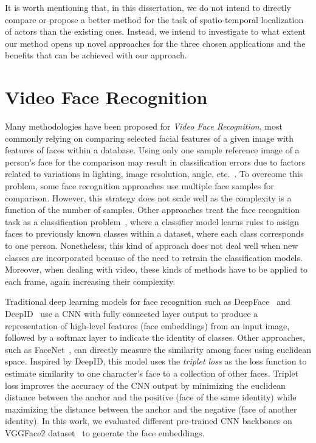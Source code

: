 It is worth mentioning that, in this dissertation, we do not intend to directly compare or propose a better method for the task of spatio-temporal localization of actors than the existing ones. Instead, we intend to investigate to what extent our method opens up novel approaches for the three chosen applications and the benefits that can be achieved with our approach.

\section{Video Face Recognition}
\label{sec:video_face}

Many methodologies have been proposed for \emph{Video Face Recognition}, most commonly relying on comparing selected facial features of a given image with features of faces within a database.
Using only one sample reference image of a person's face for the comparison may result in classification errors due to factors related to variations in lighting, image resolution, angle, etc.~\cite{598229}.
To overcome this problem, some face recognition approaches use multiple face samples for comparison. However, this strategy does not scale well as the complexity is a function of the number of samples.
Other approaches treat the face recognition task as a classification problem~\cite{dadi2016improved, ghosal}, where a classifier model learns rules to assign faces to previously known classes within a dataset, where each class corresponds to one person.
Nonetheless, this kind of approach does not deal well when new classes are incorporated because of the need to retrain the classification models.
Moreover, when dealing with video, these kinds of methods have to be applied to each frame, again increasing their complexity.


Traditional deep learning models for face recognition such as DeepFace~\cite{taigman2014deepface} and DeepID~\cite{sun2014deep} use a CNN with fully connected layer output to produce a representation of high-level features (face embeddings) from an input image, followed by a softmax layer to indicate the identity of classes. Other approaches, such as FaceNet~\cite{schroff2015facenet}, can directly measure the similarity among faces using euclidean space. Inspired by DeepID, this model uses the \textit{triplet loss} as the loss function to estimate similarity to one character's face to a  collection of other faces. Triplet loss improves the accuracy of the  CNN output by minimizing the euclidean distance between the anchor and the positive (face of the same identity) while maximizing the distance between the anchor and the negative (face of another identity). In this work, we evaluated different pre-trained CNN backbones on VGGFace2 dataset~\cite{cao2018vggface2} to generate the face embeddings. 

